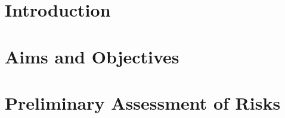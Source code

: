 \documentclass[a4paper,12pt]{article}
\begin{document}
	
	\section{Introduction}
	
	\section{Aims and Objectives}
	
	\section{Preliminary Assessment of Risks}
	
	
	\newpage
	
	\printbibliography
	
\end{document}
